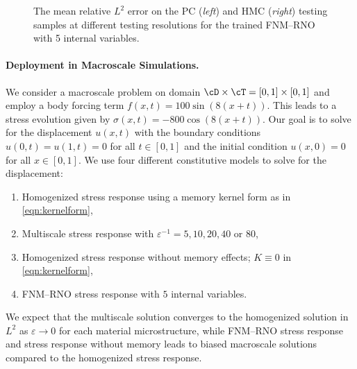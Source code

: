 \documentclass[letterpaper,11pt]{article}
\begin{document}
\begin{figure}[htbp]
    \centering
    \caption{The mean relative $L^2$ error on the PC (\textit{left}) and HMC (\textit{right}) testing samples at different testing resolutions for the trained FNM--RNO with 5 internal variables.}
    \label{fig:multiresolution_kv}
\end{figure}

\paragraph{Deployment in Macroscale Simulations.}
    We consider a macroscale problem on domain $\cD \times \cT=[0,1] \times [0,1]$ and employ a body forcing term $f(x,t)= 100\sin(8(x + t))$. This leads to a stress evolution given by $\sigma(x,t) = -800\cos(8(x+t))$. Our goal is to solve for the displacement $u(x,t)$ with the boundary conditions $u(0, t)=u(1,t)=0$ for all $t\in[0, 1]$ and the initial condition $u(x, 0)=0$ for all $x\in[0,1]$.
    We use four different constitutive models to solve for the displacement:
    \begin{enumerate}[label=(\roman*)]
    \item Homogenized stress response using a memory kernel form as in \eqref{eqn:kernelform},
    \item Multiscale stress response with $\varepsilon^{-1} = 5, 10, 20, 40$ or $80$,
    \item Homogenized stress response without memory effects; $K\equiv0$ in \eqref{eqn:kernelform},
    \item FNM--RNO stress response with $5$ internal variables.
    \end{enumerate}
    We expect that the multiscale solution converges to the homogenized solution in $L^2$ as $\varepsilon\to 0$ for each material microstructure, while FNM--RNO stress response and stress response without memory leads to biased macroscale solutions compared to the homogenized stress response.
\end{document}
